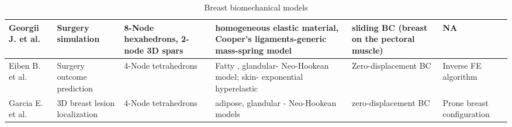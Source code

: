 \begin{sidewaystable}[!h]
\begin{tabularx}{22cm}{|p{2.5cm}|p{2.5cm}|p{3.5cm}|X|p{3.5cm}|p{2.5cm}|}
 Georgii J. et al.  \citep{georgii_simulation_2016}&Surgery simulation & 8-Node hexahedrons, 2-node 3D spars & homogeneous elastic material, Cooper's ligaments-generic mass-spring model & sliding BC (breast on the pectoral muscle) & NA\\
   \hline
  Eiben B. et al. \citep{eiben_surface_2016} & Surgery outcome prediction & 4-Node tetrahedrons & Fatty , glandular- Neo-Hookean model; skin- exponential hyperelastic & Zero-displacement BC & Inverse FE algorithm \\ 
   \hline
  Garcia E. et al. \citep{garcia_mapping_2017} & 3D breast lesion localization & 4-Node tetrahedrons & adipose, glandular  - Neo-Hookean models &zero-displacement BC & Prone breast configuration\\
   \hline
    \end{tabularx}
     \caption{Breast biomechanical models}
     \label{table:mechanical_models_table}
\end{sidewaystable}


